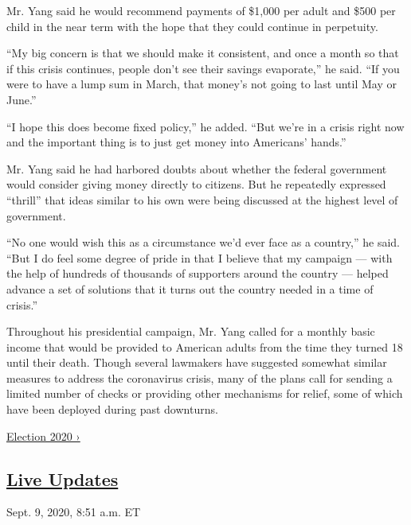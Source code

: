 Mr. Yang said he would recommend payments of \$1,000 per adult and \$500
per child in the near term with the hope that they could continue in
perpetuity.

``My big concern is that we should make it consistent, and once a month
so that if this crisis continues, people don't see their savings
evaporate,'' he said. ``If you were to have a lump sum in March, that
money's not going to last until May or June.''

``I hope this does become fixed policy,'' he added. ``But we're in a
crisis right now and the important thing is to just get money into
Americans' hands.''

Mr. Yang said he had harbored doubts about whether the federal
government would consider giving money directly to citizens. But he
repeatedly expressed ``thrill'' that ideas similar to his own were being
discussed at the highest level of government.

``No one would wish this as a circumstance we'd ever face as a
country,'' he said. ``But I do feel some degree of pride in that I
believe that my campaign --- with the help of hundreds of thousands of
supporters around the country --- helped advance a set of solutions that
it turns out the country needed in a time of crisis.''

Throughout his presidential campaign, Mr. Yang called for a monthly
basic income that would be provided to American adults from the time
they turned 18 until their death. Though several lawmakers have
suggested somewhat similar measures to address the coronavirus crisis,
many of the plans call for sending a limited number of checks or
providing other mechanisms for relief, some of which have been deployed
during past downturns.

\href{https://www.nytimes3xbfgragh.onion/news-event/2020-election}{Election
2020 ›}

\hypertarget{live-updates}{%
\subsection{\texorpdfstring{\href{https://www.nytimes3xbfgragh.onion/live/2020/09/09/us/trump-vs-biden}{Live
Updates}}{Live Updates}}\label{live-updates}}

\href{https://www.nytimes3xbfgragh.onion/live/2020/09/09/us/trump-vs-biden\#democrats-worry-about-a-partisan-slant-at-the-postal-service-where-trump-allies-dominate-the-board}{}

Sept. 9, 2020, 8:51 a.m. ET

